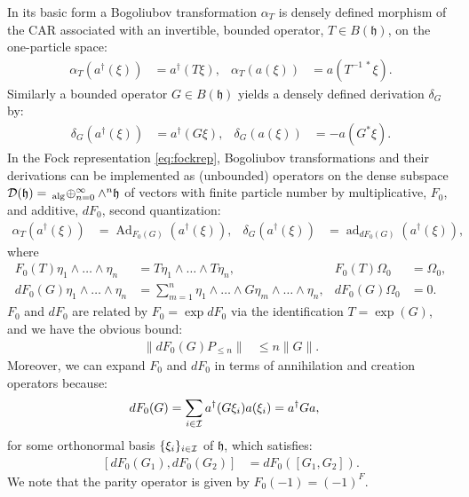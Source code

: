 \documentclass[a4paper, 11pt]{article}
\newcommand{\fh}{\mathfrak{h}}
\DeclareMathOperator{\Ad}{Ad}
\DeclareMathOperator{\ad}{ad}
\DeclareMathOperator{\1}{\mathds{1}}
\DeclareMathOperator{\alg}{alg}
\begin{document}
In its basic form a Bogoliubov transformation $\alpha_{T}$ is densely defined morphism of the CAR associated with an invertible, bounded operator, $T\in B(\fh)$, on the one-particle space:
\begin{align}
\label{eq:bogmor}
\alpha_{T}(a^{\dag}(\xi)) & = a^{\dag}(T\xi), & \alpha_{T}(a(\xi)) & = a(T^{-1\!\ *}\xi).
\end{align}
Similarly a bounded operator $G\in B(\fh)$ yields a densely defined derivation $\delta_{G}$ by:
\begin{align}
\label{eq:bogder}
\delta_{G}(a^{\dag}(\xi)) & = a^{\dag}(G\xi), & \delta_{G}(a(\xi)) & = -a(G^{*}\xi).
\end{align}
In the Fock representation \eqref{eq:fockrep}, Bogoliubov transformations and their derivations can be implemented as (unbounded) operators on the dense subspace $\cD(\fh) =\!\ _{\alg}\!\oplus_{n=0}^{\infty}\wedge^{n}\fh$ of vectors with finite particle number by multiplicative, $F_{0}$, and additive, $dF_{0}$, second quantization:
\begin{align}
\label{eq:bogmultcar}
\alpha_{T}(a^{\dag}(\xi)) & = \Ad_{F_{0}(G)}(a^{\dag}(\xi)), & \delta_{G}(a^{\dag}(\xi)) & = \ad_{dF_{0}(G)}(a^{\dag}(\xi)),
\end{align}
where
\begin{align}
\label{eq:secondquant}
F_{0}(T)\eta_{1}\wedge\dots\wedge\eta_{n} & = T\eta_{1}\wedge\dots\wedge T\eta_{n}, & F_{0}(T)\Omega_{0} & = \Omega_{0}, \\ \nonumber
dF_{0}(G)\eta_{1}\wedge\dots\wedge\eta_{n} & = \sum_{m=1}^{n}\eta_{1}\wedge\dots\wedge G\eta_{m}\wedge\dots\wedge\eta_{n}, & dF_{0}(G)\Omega_{0} & = 0.
\end{align}
$F_{0}$ and $dF_{0}$ are related by $F_{0} = \exp dF_{0}$ via the identification $T = \exp(G)$, and we have the obvious bound:
\begin{align}
\label{eq:secondquantbound}
\|dF_{0}(G)P_{\leq n}\| & \leq n \|G\|.
\end{align}
Moreover, we can expand $F_{0}$ and $dF_{0}$ in terms of annihilation and creation operators because:
\begin{align}
\label{eq:secondquantaraki}
dF_{0}(G) & = \sum_{i\in\mathcal{I}}a^{\dag}(G\xi_{i})a(\xi_{i}) = a^{\dag}Ga,
\end{align}
for some orthonormal basis $\{\xi_{i}\}_{i\in\mathcal{I}}$ of $\fh$, which satisfies:
\begin{align}
\label{eq:secondquantcomm}
[dF_{0}(G_{1}),dF_{0}(G_{2})] & = dF_{0}([G_{1},G_{2}]).
\end{align}
We note that the parity operator is given by $F_{0}(-1) = (-1)^{F}$. 
\end{document}
